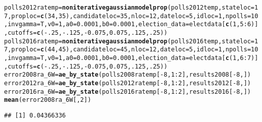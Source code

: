 \documentclass{article}\usepackage[]{graphicx}\usepackage[]{color}
\makeatletter
\newcommand{\hlnum}[1]{\textcolor[rgb]{0.686,0.059,0.569}{#1}}%
\newcommand{\hlopt}[1]{\textcolor[rgb]{0,0,0}{#1}}%
\newcommand{\hlstd}[1]{\textcolor[rgb]{0.345,0.345,0.345}{#1}}%
\newcommand{\hlkwb}[1]{\textcolor[rgb]{0.69,0.353,0.396}{#1}}%
\newcommand{\hlkwc}[1]{\textcolor[rgb]{0.333,0.667,0.333}{#1}}%
\newcommand{\hlkwd}[1]{\textcolor[rgb]{0.737,0.353,0.396}{\textbf{#1}}}%
\newenvironment{kframe}{%
 \def\at@end@of@kframe{}%
 \ifinner\ifhmode%
  \def\at@end@of@kframe{\end{minipage}}%
  \begin{minipage}{\columnwidth}%
 \fi\fi%
 \def\FrameCommand##1{\hskip\@totalleftmargin \hskip-\fboxsep
 \colorbox{shadecolor}{##1}\hskip-\fboxsep
     \hskip-\linewidth \hskip-\@totalleftmargin \hskip\columnwidth}%
 \MakeFramed {\advance\hsize-\width
   \@totalleftmargin\z@ \linewidth\hsize
   \@setminipage}}%
 {\par\unskip\endMakeFramed%
 \at@end@of@kframe}
\newenvironment{knitrout}{}{} %
\makeatother
\begin{document}
\begin{knitrout}
\begin{kframe}
\begin{alltt}
\hlstd{polls2012ratemp} \hlkwb{=} \hlkwd{noniterativegaussianmodelprop}\hlstd{(polls2012temp,} \hlkwc{stateloc} \hlstd{=} \hlnum{17}\hlstd{,} \hlkwc{proploc} \hlstd{=} \hlkwd{c}\hlstd{(}\hlnum{34}\hlstd{,} \hlnum{35}\hlstd{),} \hlkwc{candidateloc} \hlstd{=} \hlnum{35}\hlstd{,}  \hlkwc{nloc} \hlstd{=} \hlnum{12}\hlstd{,} \hlkwc{dateloc} \hlstd{=} \hlnum{5}\hlstd{,} \hlkwc{idloc} \hlstd{=} \hlnum{1}\hlstd{,}  \hlkwc{npolls} \hlstd{=} \hlnum{10}\hlstd{,}\hlkwc{invgamma} \hlstd{= T,} \hlkwc{v0}\hlstd{=}\hlnum{1}\hlstd{,} \hlkwc{a0}\hlstd{=}\hlnum{0.0001}\hlstd{,} \hlkwc{b0}\hlstd{=}\hlnum{0.0001}\hlstd{,}  \hlkwc{election_data} \hlstd{= electdata[}\hlkwd{c}\hlstd{(}\hlnum{1}\hlstd{,} \hlnum{5}\hlopt{:}\hlnum{6}\hlstd{)],} \hlkwc{cutoffs} \hlstd{=} \hlkwd{c}\hlstd{(}\hlopt{-}\hlnum{.25}\hlstd{,} \hlopt{-}\hlnum{.125}\hlstd{,} \hlopt{-}\hlnum{0.075}\hlstd{,} \hlnum{0.075}\hlstd{,} \hlnum{.125}\hlstd{,} \hlnum{.25}\hlstd{))}
\hlstd{polls2016ratemp} \hlkwb{=} \hlkwd{noniterativegaussianmodelprop}\hlstd{(polls2016temp,} \hlkwc{stateloc} \hlstd{=} \hlnum{17}\hlstd{,} \hlkwc{proploc} \hlstd{=} \hlkwd{c}\hlstd{(}\hlnum{44}\hlstd{,} \hlnum{45}\hlstd{),} \hlkwc{candidateloc} \hlstd{=} \hlnum{45}\hlstd{,} \hlkwc{nloc} \hlstd{=} \hlnum{12}\hlstd{,} \hlkwc{dateloc} \hlstd{=} \hlnum{5}\hlstd{,} \hlkwc{idloc} \hlstd{=} \hlnum{1}\hlstd{,}\hlkwc{npolls} \hlstd{=} \hlnum{10}\hlstd{,} \hlkwc{invgamma} \hlstd{= T,} \hlkwc{v0}\hlstd{=}\hlnum{1}\hlstd{,} \hlkwc{a0}\hlstd{=}\hlnum{0.0001}\hlstd{,} \hlkwc{b0}\hlstd{=}\hlnum{0.0001}\hlstd{,} \hlkwc{election_data} \hlstd{= electdata[}\hlkwd{c}\hlstd{(}\hlnum{1}\hlstd{,} \hlnum{6}\hlopt{:}\hlnum{7}\hlstd{)],} \hlkwc{cutoffs} \hlstd{=} \hlkwd{c}\hlstd{(}\hlopt{-}\hlnum{.25}\hlstd{,} \hlopt{-}\hlnum{.125}\hlstd{,} \hlopt{-}\hlnum{0.075}\hlstd{,} \hlnum{0.075}\hlstd{,} \hlnum{.125}\hlstd{,} \hlnum{.25}\hlstd{))}
\hlstd{error2008ra_6W} \hlkwb{=} \hlkwd{ae_by_state}\hlstd{(polls2008ratemp[}\hlopt{-}\hlnum{8}\hlstd{,} \hlnum{1}\hlopt{:}\hlnum{2}\hlstd{], results2008[}\hlopt{-}\hlnum{8}\hlstd{, ])}
\hlstd{error2012ra_6W} \hlkwb{=} \hlkwd{ae_by_state}\hlstd{(polls2012ratemp[}\hlopt{-}\hlnum{8}\hlstd{,} \hlnum{1}\hlopt{:}\hlnum{2}\hlstd{], results2012[}\hlopt{-}\hlnum{8}\hlstd{, ])}
\hlstd{error2016ra_6W} \hlkwb{=} \hlkwd{ae_by_state}\hlstd{(polls2016ratemp[}\hlopt{-}\hlnum{8}\hlstd{,} \hlnum{1}\hlopt{:}\hlnum{2}\hlstd{], results2016[}\hlopt{-}\hlnum{8}\hlstd{, ])}
\hlkwd{mean}\hlstd{(error2008ra_6W[,}\hlnum{2}\hlstd{])}
\end{alltt}
\begin{verbatim}
## [1] 0.04366336

\end{verbatim}
\end{kframe}
\end{knitrout}
\end{document}
